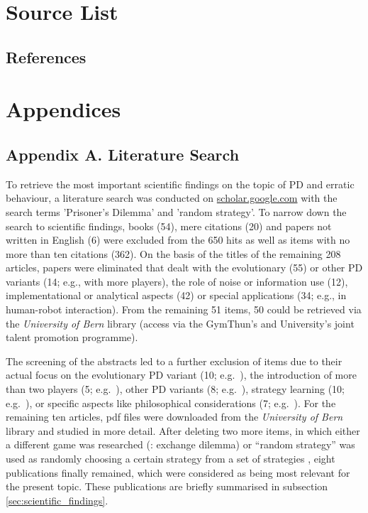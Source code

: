 \documentclass[11pt]{article}
\begin{document}
\section{Source List} \label{sec:sources}
\subsection*{References}
\printbibliography[title={}]

\newpage

\appendix

\section{Appendices} \label{sec:appendices}
\subsection{Appendix A. Literature Search} \label{sec:Appx_search}
To retrieve the most important scientific findings on the topic of PD and erratic behaviour, a literature search was conducted on \url{scholar.google.com} with the search terms 'Prisoner's Dilemma' and 'random strategy'. 
To narrow down the search to scientific findings, books (54), mere citations (20) and papers not written in English (6) were excluded from the 650 hits as well as items with no more than ten citations (362).
On the basis of the titles of the remaining 208 articles, papers were eliminated that dealt with the evolutionary (55) or other PD variants (14; e.g., with more players), the role of noise or information use (12), implementational or analytical aspects (42) or special applications (34; e.g., in human-robot interaction). 
From the remaining 51 items, 50 could be retrieved via the \textit{University of Bern} library (access via the GymThun's and University’s joint talent promotion programme). 

The screening of the abstracts led to a further exclusion of items due to their actual focus on the evolutionary PD variant (10; e.g.~\cite{SSLP09}), the introduction of more than two players (5; e.g.~\cite{IGP04}), other PD variants (8; e.g.~\cite{HY98}), strategy learning (10; e.g.~\cite{HZX22}), or specific aspects like philosophical considerations (7; e.g.~\cite{McL81}). 
For the remaining ten articles, pdf files were downloaded from the \textit{University of Bern} library and studied in more detail.
After deleting two more items, in which either a different game was researched (\cite{BF06}: exchange dilemma) or “random strategy” was used as randomly choosing a certain strategy from a set of strategies \cite{CF23}, eight publications finally remained, which were considered as being most relevant for the present topic.
These publications are briefly summarised in subsection \ref{sec:scientific_findings}.
\end{document}

